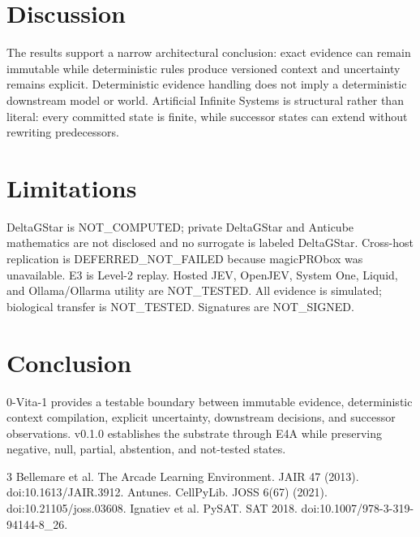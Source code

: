 \documentclass[11pt]{article}
\begin{document}
\section{Discussion}The results support a narrow architectural conclusion: exact evidence can remain immutable while deterministic rules produce versioned context and uncertainty remains explicit. Deterministic evidence handling does not imply a deterministic downstream model or world. Artificial Infinite Systems is structural rather than literal: every committed state is finite, while successor states can extend without rewriting predecessors.
\section{Limitations}%
DeltaGStar is NOT\_COMPUTED; private DeltaGStar and Anticube mathematics are not disclosed and no surrogate is labeled DeltaGStar.
Cross-host replication is DEFERRED\_NOT\_FAILED because magicPRObox was unavailable. E3 is Level-2 replay. Hosted JEV, OpenJEV, System One, Liquid, and Ollama/Ollarma utility are NOT\_TESTED. All evidence is simulated; biological transfer is NOT\_TESTED. Signatures are NOT\_SIGNED.
\section{Conclusion}0-Vita-1 provides a testable boundary between immutable evidence, deterministic context compilation, explicit uncertainty, downstream decisions, and successor observations. v0.1.0 establishes the substrate through E4A while preserving negative, null, partial, abstention, and not-tested states.
\begin{thebibliography}{3}
 Bellemare et al. The Arcade Learning Environment. JAIR 47 (2013). doi:10.1613/JAIR.3912.
 Antunes. CellPyLib. JOSS 6(67) (2021). doi:10.21105/joss.03608.
 Ignatiev et al. PySAT. SAT 2018. doi:10.1007/978-3-319-94144-8\_26.
\end{thebibliography}
\end{document}
